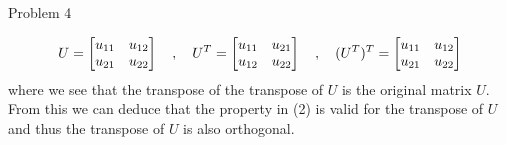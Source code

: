 \begin{problem}{Problem 4}
\begin{highlight}[Solution]
        \begin{equation}
            U = 
            \begin{bmatrix}
                u_{11} & u_{12} \\
                u_{21} & u_{22} \\
            \end{bmatrix}
            \hspace*{10pt} , \hspace*{10pt}
            U^{T} = 
            \begin{bmatrix}
                u_{11} & u_{21} \\
                u_{12} & u_{22} \\
            \end{bmatrix}
            \hspace*{10pt} , \hspace*{10pt}
            (U^{T})^{T} = 
            \begin{bmatrix}
                u_{11} & u_{12} \\
                u_{21} & u_{22} \\
            \end{bmatrix}
        \end{equation}
        where we see that the transpose of the transpose of $U$ is the original matrix $U$. From this we can deduce that the property in (2) is valid for the transpose of $U$ and thus the transpose of 
        $U$ is also orthogonal.
    \end{highlight}
\end{problem}

